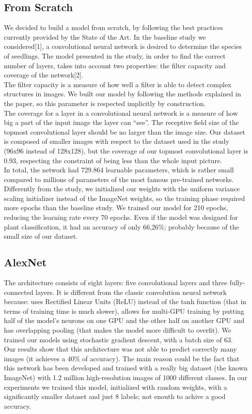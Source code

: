 \documentclass[11pt, oneside]{article}
\begin{document}
\subsection{From Scratch}
We decided to build a model from scratch, by following the best practices currently provided by the State of the Art. In the baseline study we considered[1],  a convolutional neural network is desired to determine the species of seedlings. 
The model presented in the study, in order to find the correct number of layers, takes into account two properties: the filter capacity and coverage of the network[2]. \\
The filter capacity is a measure of how well a filter is able to detect complex structures in images. 
We built our model by following the methods explained in the paper, so this parameter is respected implicitly by construction. \\
The coverage for a layer in a convolutional neural network is a measure of how big a part of the input image the layer can “see”. 
The receptive field size of the topmost convolutional layer should be no larger than the image size. Our dataset is composed of smaller images with respect to the dataset used in the study (96x96 instead of 128x128), but the coverage of our topmost convolutional layer is 0.93, respecting the constraint of being less than the whole input picture. \\
In total, the network had 729.864 learnable parameters, which is rather small compared to millions of parameters of the most famous pre-trained networks. Differently from the study, we initialized our weights with the uniform variance scaling initializer instead of the ImageNet weights, so the training phase required more epochs than the baseline study. We trained our model for 210 epochs, reducing the learning rate every 70 epochs. Even if the model was designed for plant classification, it had an accuracy of only 66,26\%; probably because of the small size of our dataset.
\subsection{AlexNet}
The architecture consists of eight layers: five convolutional layers and three fully-connected layers. It is different from the classic convolution neural network because: uses Rectified Linear Units (ReLU) instead of the tanh function (that in terms of training time is much slower), allows for multi-GPU training by putting half of the model’s neurons on one GPU and the other half on another GPU and has overlapping pooling (that makes the model more difficult to overfit).
We trained our models using stochastic gradient descent, with a batch size of 63.\\
Our results show that this architecture was not able to predict correctly many images (it achieves a 40\% of accuracy). The main reason could be the fact that this network has been developed and trained with a really big dataset (the known ImageNet) with  1.2 million high-resolution images of 1000 different classes. In our experiments we trained this model, initialized with random weights, with a significantly smaller dataset and just 8 labels; not enouth to achive a good accuracy.
\end{document}
